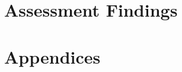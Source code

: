 \section{Assessment Findings}




\newpage

\section*{Appendices}

\begin{appendices}


\end{appendices}

